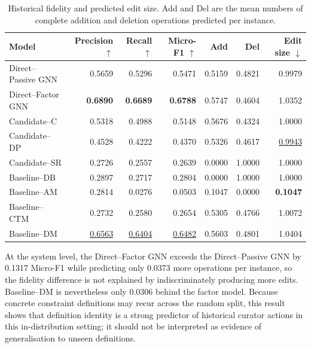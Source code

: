 \documentclass[a4paper,UKenglish,cleveref,autoref,thm-restate]{tgdk-v2021}
\begin{document}
\begin{table}[h]
\caption{Historical fidelity and predicted edit size. Add and Del are the mean numbers of complete addition and deletion operations predicted per instance.}
\label{tab:main-results}
\centering
\small
\begin{tabular}{lrrrrrr}
\toprule
\textbf{Model} & \textbf{Precision \(\uparrow\)} & \textbf{Recall \(\uparrow\)} & \textbf{Micro-F1 \(\uparrow\)} & \textbf{Add} & \textbf{Del} & \textbf{Edit size \(\downarrow\)} \\
\midrule
Direct--Passive GNN & 0.5659 & 0.5296 & 0.5471 & 0.5159 & 0.4821 & 0.9979 \\
Direct--Factor GNN  & \textbf{0.6890} & \textbf{0.6689} & \textbf{0.6788} & 0.5747 & 0.4604 & 1.0352 \\
\midrule
Candidate--C  & 0.5318 & 0.4988 & 0.5148 & 0.5676 & 0.4324 & 1.0000 \\
Candidate--DP & 0.4528 & 0.4222 & 0.4370 & 0.5326 & 0.4617 & \underline{0.9943} \\
Candidate--SR & 0.2726 & 0.2557 & 0.2639 & 0.0000 & 1.0000 & 1.0000 \\
\midrule
Baseline--DB & 0.2897 & 0.2717 & 0.2804 & 0.0000 & 1.0000 & 1.0000 \\
Baseline--AM & 0.2814 & 0.0276 & 0.0503 & 0.1047 & 0.0000 & \textbf{0.1047} \\
Baseline--CTM & 0.2732 & 0.2580 & 0.2654 & 0.5305 & 0.4766 & 1.0072 \\
Baseline--DM & \underline{0.6563} & \underline{0.6404} & \underline{0.6482} & 0.5603 & 0.4801 & 1.0404 \\
\bottomrule
\end{tabular}
\end{table}

At the system level, the Direct--Factor GNN exceeds the Direct--Passive GNN by 0.1317 Micro-F1 while predicting only 0.0373 more operations per instance, so the fidelity difference is not explained by indiscriminately producing more edits. Baseline--DM is nevertheless only 0.0306 behind the factor model. Because concrete constraint definitions may recur across the random split, this result shows that definition identity is a strong predictor of historical curator actions in this in-distribution setting; it should not be interpreted as evidence of generalisation to unseen definitions. 
\end{document}
